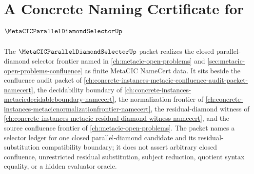 \chapter{A Concrete Naming Certificate for $\MetaCICParallelDiamondSelectorUp$}
\label{ch:concrete-instances-metacic-parallel-diamond-selector-namecert}

The $\MetaCICParallelDiamondSelectorUp$ packet realizes the closed parallel-diamond selector frontier named in \autoref{ch:metacic-open-problems} and \autoref{sec:metacic-open-problems-confluence} as finite MetaCIC NameCert data. It sits beside the confluence audit packet of \autoref{ch:concrete-instances-metacic-confluence-audit-packet-namecert}, the decidability boundary of \autoref{ch:concrete-instances-metacicdecidableboundary-namecert}, the normalization frontier of \autoref{ch:concrete-instances-metacicnormalizationfrontier-namecert}, the residual-diamond witness of \autoref{ch:concrete-instances-metacic-residual-diamond-witness-namecert}, and the source confluence frontier of \autoref{ch:metacic-open-problems}. The packet names a selector ledger for one closed parallel-diamond candidate and its residual-substitution compatibility boundary; it does not assert arbitrary closed confluence, unrestricted residual substitution, subject reduction, quotient syntax equality, or a hidden evaluator oracle.

